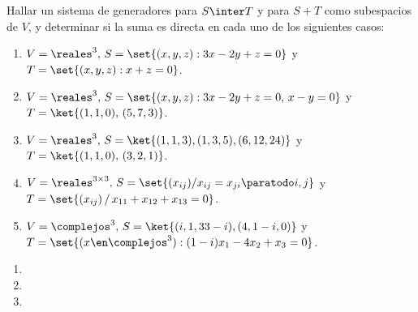 \begin{enunciado}{\ejercicio}
  Hallar un sistema de generadores para $S \inter T$ y para $S + T$ como subespacios de $V$, y
  determinar si la suma es directa en cada uno de los siguientes casos:
  \begin{enumerate}[label=(\alph*)]
    \item $V = \reales^3,\, S = \set{(x,y,z) : 3x - 2y + z = 0}$ y $T = \set{(x, y ,z) : x + z =0}$.
    \item $V = \reales^3,\, S = \set{(x,y,z) : 3x - 2y + z = 0,\, x-y = 0}$ y $T = \ket{(1,1,0),\, (5,7,3)}$.
    \item $V = \reales^3,\, S = \ket{(1,1,3), (1,3,5), (6,12,24)}$ y $T = \ket{(1,1,0),\, (3,2,1)}$.
    \item $V = \reales^{3 \times 3},\, S = \set{(x_{ij}) / x_{ij} = x_{ji} \paratodo i, j}$ y $T = \set{(x_{ij})\, /\,  x_{11} + x_{12} + x_{13} = 0}$.
    \item $V = \complejos^3,\, S = \ket{(i, 1, 3 3-i), (4,1 - i, 0)}$ y $T = \set{(x \en \complejos^3) : (1 - i)x_1 - 4x_2 + x_3 = 0}$.
  \end{enumerate}
  \begin{enumerate}[label=(\alph*)]
    \item \hacer
    \item \hacer
    \item \hacer


\end{enumerate}
\end{enunciado}
